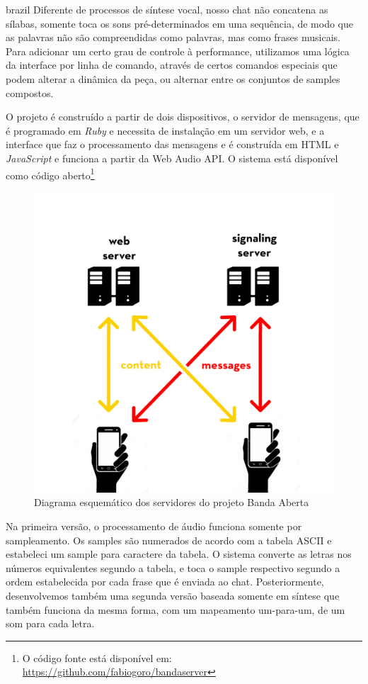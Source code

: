 \begin{otherlanguage*}{brazil}
Diferente de processos de síntese vocal, nosso chat não concatena as sílabas, somente toca os sons pré-determinados em uma sequência, de modo que as palavras não são compreendidas como palavras, mas como frases musicais. Para adicionar um certo grau de controle à performance, utilizamos uma lógica da interface por linha de comando, através de certos comandos especiais que podem alterar a dinâmica da peça, ou alternar entre os conjuntos de samples compostos.

O projeto é construído a partir de dois dispositivos, o servidor de mensagens, que é programado em \emph{Ruby} e necessita de instalação em um servidor web, e a interface que faz o processamento das mensagens e é construída em HTML e \emph{JavaScript}  e funciona a partir da Web Audio API. O sistema está disponível como código aberto\footnote{O código fonte está disponível em: \url{https://github.com/fabiogoro/bandaserver}}   

\begin{figure}[htb]
    \caption{\label{bandaabertaserver}Diagrama esquemático dos servidores do projeto Banda Aberta}
    \begin{center}
        \includegraphics[width=0.5\linewidth]{pictures/server.jpg}
    \end{center}
\end{figure}

Na primeira versão, o processamento de áudio funciona somente por sampleamento. Os samples são numerados de acordo com a tabela ASCII e estabeleci um sample para caractere da tabela. O sistema converte as letras nos números equivalentes segundo a tabela, e toca o sample respectivo segundo a ordem estabelecida por cada frase que é enviada ao chat. Posteriormente, desenvolvemos também uma segunda versão baseada somente em síntese que também funciona da mesma forma, com um mapeamento um-para-um, de um som para cada letra.


\end{otherlanguage*}
